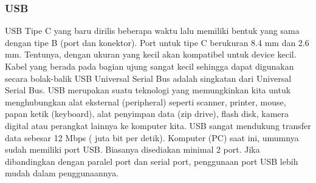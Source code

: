 \subsubsection{USB}
USB Tipe C yang baru dirilis beberapa waktu lalu memiliki bentuk yang sama dengan tipe B (port dan konektor). Port untuk tipe C berukuran 8.4 mm dan 2.6 mm. Tentunya, dengan ukuran yang kecil akan kompatibel untuk device kecil. Kabel yang berada pada bagian ujung sangat kecil sehingga dapat digunakan secara bolak-balik
USB Universal Serial Bus adalah singkatan dari Universal Serial Bus. USB merupakan suatu teknologi yang memungkinkan kita untuk menghubungkan alat eksternal (peripheral) seperti scanner, printer, mouse, papan ketik (keyboard), alat penyimpan data (zip drive), flash disk, kamera digital atau perangkat lainnya ke komputer kita. USB sangat mendukung transfer data sebesar 12 Mbps ( juta bit per detik). Komputer (PC) saat ini, umumnya sudah memiliki port USB. Biasanya disediakan minimal 2 port. Jika dibandingkan dengan paralel port dan serial port, penggunaan port USB lebih mudah dalam penggunaannya.